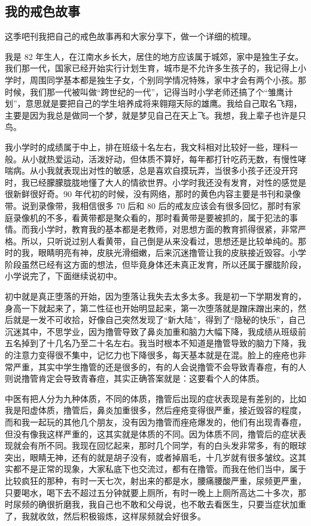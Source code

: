 \subsection{我的戒色故事}

这季吧刊我把自己的戒色故事再和大家分享下，做一个详细的梳理。

我是 82 年生人，在江南水乡长大，居住的地方应该属于城郊，家中是独生子女。我们那一代，国家已经开始实行计划生育，城市是不允许多生孩子的，我记得上小学时，周围同学基本都是独生子女，个别同学情况特殊，家中才会有两个小孩。那时候，我们那一代被叫做“跨世纪的一代”，记得当时小学老师还搞了个“雏鹰计划”，意思就是要把自己的学生培养成将来翱翔天际的雄鹰。我给自己取名飞翔，主要是因为我总是做同一个梦，就是梦见自己在天上飞。我想，我上辈子也许是只鸟。

我小学时的成绩属于中上，排在班级十名左右，我文科相对比较好一些，理科一般。从小就热爱运动，活泼好动，但体质不算好，每年都打针吃药无数，有慢性哮喘病。从小我就表现出对性的敏感，总是喜欢自摸玩弄，当很多小孩子还没开窍时，我已经朦朦胧胧地懂了大人的情欲世界。小学时我还没有发育，对性的感觉是很新鲜很好奇。90 年代初的时候，没有网络，那时的黄色内容主要是书刊和录像带。说到录像带，我相信很多 70 后和 80 后的戒友应该会有很多回忆，那时有家庭录像机的不多，看黄带都是聚众看的，那时看黄带是要被抓的，属于犯法的事情。而我小学时，教育我的基本都是老教师，对思想方面的教育抓得很紧，非常严格。所以，只听说过别人看黄带，自己倒是从来没看过，思想还是比较单纯的。那时的我，眼睛明亮有神，皮肤光滑细嫩，后来沉迷撸管让我的皮肤接近毁容。小学阶段虽然已经有这方面的想法，但毕竟身体还未真正发育，所以还属于朦胧阶段，小学说完了，下面继续说初中。

初中就是真正堕落的开始，因为堕落让我失去太多太多。我是初一下学期发育的，身高一下就起来了，第二性征也开始明显起来，第一次堕落就是蹭床蹭出来的，然后就是一发不可收拾，好像自己突然发现了“新大陆”，得到了“隐秘的快乐”，自己沉迷其中，不思学业，因为撸管导致了鼻炎加重和脑力大幅下降，我成绩从班级前五名掉到了十几名乃至二十名左右。我当时根本不知道是撸管导致的脑力下降，我的注意力变得很不集中，记忆力也下降很多，每天基本就是在混。脸上的痤疮也非常严重，其实中学生撸管的还是很多的，有的人会说撸管不会导致青春痘，有的人则说撸管肯定会导致青春痘，其实正确答案就是：这要看个人的体质。

中医有把人分为九种体质，不同的体质，撸管后出现的症状表现是有差别的，比如我是阳虚体质，撸管后，鼻炎加重很多，然后痤疮变得很严重，接近毁容的程度，而和我一起玩的其他几个朋友，没有因为撸管而痤疮爆发的，他们有出现青春痘，但没有像我这样严重的，这其实就是体质的不同。因为体质不同，撸管后的症状表现就会有所不同。我现在回忆起来，那时几个同学，有的白头发非常多，有的眼球突出，眼睛无神，还有的就是胡子没有，或者掉眉毛，十几岁就有很多皱纹。这其实都不是正常的现象，大家私底下也交流过，都有在撸管。而我在他们当中，属于比较疯狂的那种，有时一天七次，射出来的都是水，腰痛腰酸严重，尿频更严重，只要喝水，喝下去不超过五分钟就要上厕所，有时一晚上上厕所高达二十多次，那时尿频的确很折磨我，我自己也不敢和父母说，也不敢去看医生，只要当症状加重了，我就收敛，然后积极锻炼，这样尿频就会好很多。

